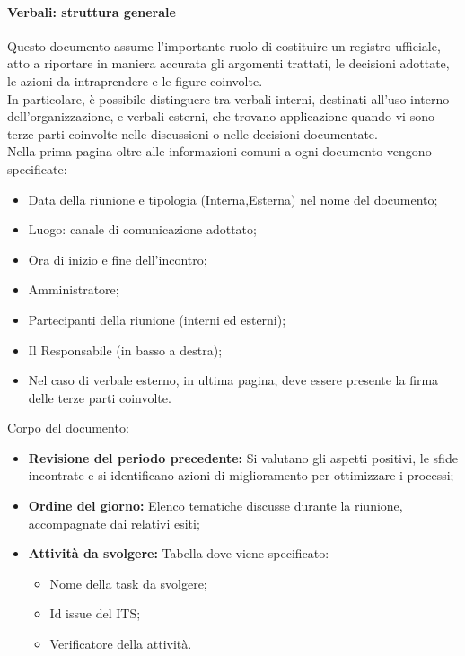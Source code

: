 \documentclass{article}
\begin{document}
\paragraph{Verbali: struttura generale}
Questo documento assume l'importante ruolo di costituire un registro ufficiale, atto a riportare in maniera accurata gli argomenti trattati, le decisioni adottate, le azioni da intraprendere e le figure coinvolte.\\
In particolare, è possibile distinguere tra verbali interni, destinati all'uso interno dell'organizzazione, e verbali esterni, che trovano applicazione quando vi sono terze parti coinvolte nelle discussioni o nelle decisioni documentate.\\
Nella prima pagina oltre alle informazioni comuni a ogni documento vengono specificate:
\begin{itemize}
    \item Data della riunione e tipologia (Interna,Esterna) nel nome del documento;
    \item Luogo: canale di comunicazione adottato;
    \item Ora di inizio e fine dell'incontro;
    \item Amministratore;
    \item Partecipanti della riunione (interni ed esterni);
    \item Il Responsabile (in basso a destra);
    \item Nel caso di verbale esterno, in ultima pagina, deve essere presente la firma delle terze parti coinvolte.
\end{itemize}
Corpo del documento:
\begin{itemize}
    \item  \textbf{Revisione del periodo precedente:} Si valutano gli aspetti positivi, le sfide incontrate e si identificano azioni di miglioramento per ottimizzare i processi;
    \item  \textbf{Ordine del giorno:} Elenco tematiche discusse durante la riunione, accompagnate dai relativi esiti;
    \item  \textbf{Attività da svolgere:} Tabella dove viene specificato:
          \begin{itemize}
              \item Nome della task da svolgere;
              \item Id issue del ITS;
              \item Verificatore della attività.
          \end{itemize}
\end{itemize}
\end{document}
